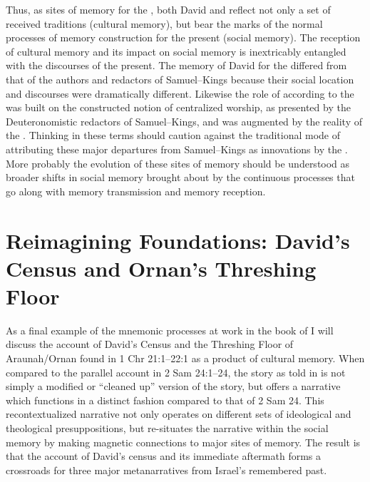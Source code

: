 Thus, as sites of memory for the \chronicler, both David and \thetemple reflect not only a set of received traditions (cultural memory), but bear the marks of the normal processes of memory construction for the present (social memory). The reception of cultural memory and its impact on social memory is inextricably entangled with the discourses of the present. The memory of David for the \chronicler differed from that of the authors and redactors of Samuel--Kings because their social location and discourses were dramatically different. Likewise the role of \thetemple according to the \chronicler was built on the constructed notion of centralized worship, as presented by the Deuteronomistic redactors of Samuel--Kings, and was augmented by the reality of the \secondtemple. Thinking in these terms should caution against the traditional mode of attributing these major departures from Samuel--Kings as innovations by the \chronicler. More probably the evolution of these sites of memory should be understood as broader shifts in social memory brought about by the continuous processes that go along with memory transmission and memory reception. 

\section{Reimagining Foundations: David's Census and Ornan's Threshing Floor}

As a final example of the mnemonic processes at work in the book of \chronicles I will discuss the account of David's Census and the Threshing Floor of Araunah/Ornan found in 1 Chr 21:1--22:1 as a product of cultural memory. When compared to the parallel account in 2 Sam 24:1--24, the story as told in \chronicles is not simply a modified or ``cleaned up'' version of the story, but offers a narrative which functions in a distinct fashion compared to that of 2 Sam 24. This recontextualized narrative not only operates on different sets of ideological and theological presuppositions, but re-situates the narrative within the social memory by making magnetic connections to major sites of memory. The result is that the account of David's census and its immediate aftermath forms a crossroads for three major metanarratives from Israel's remembered past.

